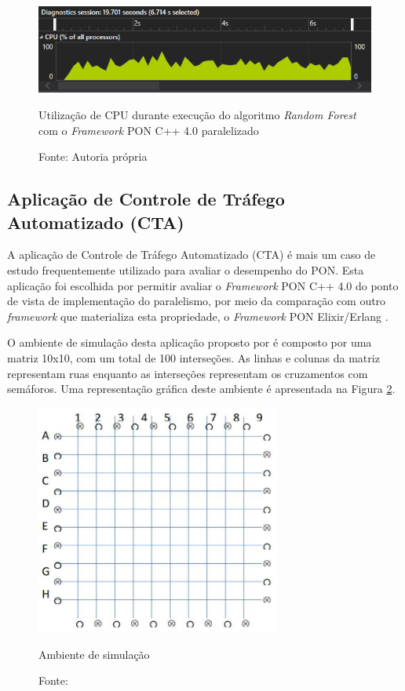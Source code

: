 \begin{figure}[!htb]
\centering
\includegraphics[width=\textwidth]{../figures/cpu_rf_par.png}
\smallskip
\caption{Utilização de CPU durante execução do algoritmo \textit{Random Forest}
com o \textit{Framework} PON C++ 4.0 paralelizado}
\caption*{Fonte: Autoria própria}
\label{fig:rf_cpu_par}
\end{figure}


\subsection{Aplicação de Controle de Tráfego Automatizado (CTA)}\label{sec:semaforo}

A aplicação de Controle de Tráfego Automatizado (CTA) é mais um caso de estudo frequentemente
utilizado para avaliar o desempenho do PON. Esta aplicação foi escolhida por
permitir avaliar o \textit{Framework} PON C++ 4.0  do ponto de vista de
implementação do paralelismo, por meio da comparação com outro
\textit{framework} que materializa esta propriedade, o \textit{Framework} PON
Elixir/Erlang \cite{msc_negrini_2019}.

O ambiente de simulação desta aplicação proposto por  é
composto por uma matriz 10x10, com um total de 100 interseções. As linhas e
colunas da matriz representam ruas enquanto as interseções representam os
cruzamentos com semáforos. Uma representação gráfica deste ambiente é
apresentada na Figura \ref{fig:cta_renaux}.

\begin{figure}[!htb]
\centering
\includegraphics[width=0.72\textwidth]{../figures/semaforos_renaux.png}
\smallskip
\caption{Ambiente de simulação}
\caption*{Fonte: }
\label{fig:cta_renaux}
\end{figure}

